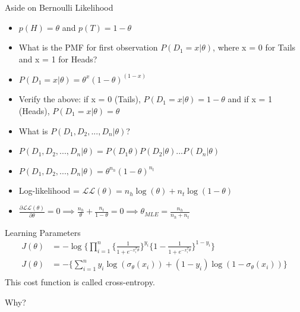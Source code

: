 \documentclass{beamer}
\begin{document}
\begin{frame}{Aside on Bernoulli Likelihood}
\begin{itemize}[<+->]
\item $p(H) = \theta$ and $p(T) = 1 - \theta$
\item What is the PMF for first observation $P(D_1 = x|\theta)$, where x = 0 for Tails and x = 1 for Heads?
\item $P(D_1 = x|\theta) = \theta^x(1-\theta)^{(1-x)}$
\item Verify the above: if x = 0 (Tails), $P(D_1 = x|\theta) = 1 - \theta$ and if x = 1 (Heads), $P(D_1 = x|\theta)  = \theta$
\item What is $P(D_1, D_2, ..., D_n|\theta)$?
\item $P(D_1, D_2, ..., D_n|\theta) = P(D_1\theta)P(D_2|\theta)...P(D_n|\theta)$
\item $P(D_1, D_2, ..., D_n|\theta) =\theta^{n_h}(1-\theta)^{n_t}$
\item Log-likelihood = $\mathcal{LL}(\theta) = n_h\log(\theta) + n_t\log(1-\theta)$
\item $\frac{\partial \mathcal{LL}(\theta)}{\partial \theta} = 0 \implies \frac{n_h}{\theta} + \frac{n_t}{1-\theta} = 0 \implies \theta_{MLE} = \frac{n_h}{n_h + n_t}$

\end{itemize}

\end{frame}

\begin{frame}{Learning Parameters}
\begin{align*}
J(\theta) &= -\log \bigg\{\prod_{i=1}^{n} \Big\{\frac{1}{1 + e^{-x_{i}^T\theta}}\Big\}^{y_{i}}\Big\{1 - \frac{1}{1 + e^{-x_{i}^T\theta}}\Big\}^{1 - y_{i}}\bigg\}\\
J(\theta) &= -\bigg\{\sum_{i=1}^{n} y_{i} \log(\sigma_{\theta}(x_{i})) + (1 - y_{i})\log(1 - \sigma_{\theta}(x_{i}))\bigg\} \\
\end{align*}
\pause This cost function is called cross-entropy.

\pause Why?
\end{frame}
\end{document}
